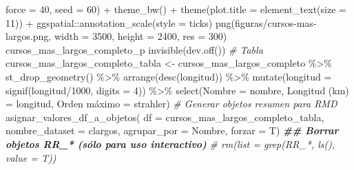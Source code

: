 \documentclass[spanish]{article}
\newenvironment{Shaded}{\begin{snugshade}}{\end{snugshade}}
\newcommand{\AttributeTok}[1]{\textcolor[rgb]{0.77,0.63,0.00}{#1}}
\newcommand{\CommentTok}[1]{\textcolor[rgb]{0.56,0.35,0.01}{\textit{#1}}}
\newcommand{\DecValTok}[1]{\textcolor[rgb]{0.00,0.00,0.81}{#1}}
\newcommand{\DocumentationTok}[1]{\textcolor[rgb]{0.56,0.35,0.01}{\textbf{\textit{#1}}}}
\newcommand{\FunctionTok}[1]{\textcolor[rgb]{0.00,0.00,0.00}{#1}}
\newcommand{\NormalTok}[1]{#1}
\newcommand{\OtherTok}[1]{\textcolor[rgb]{0.56,0.35,0.01}{#1}}
\newcommand{\SpecialCharTok}[1]{\textcolor[rgb]{0.00,0.00,0.00}{#1}}
\newcommand{\StringTok}[1]{\textcolor[rgb]{0.31,0.60,0.02}{#1}}
\begin{document}
\begin{Shaded}
\begin{Highlighting}[]
    \AttributeTok{force =} \DecValTok{40}\NormalTok{, }\AttributeTok{seed =} \DecValTok{60}\NormalTok{) }\SpecialCharTok{+}
  \FunctionTok{theme\_bw}\NormalTok{() }\SpecialCharTok{+} 
  \FunctionTok{theme}\NormalTok{(}\AttributeTok{plot.title =} \FunctionTok{element\_text}\NormalTok{(}\AttributeTok{size =} \DecValTok{11}\NormalTok{)) }\SpecialCharTok{+}
\NormalTok{  ggspatial}\SpecialCharTok{::}\FunctionTok{annotation\_scale}\NormalTok{(}\AttributeTok{style =} \StringTok{\textquotesingle{}ticks\textquotesingle{}}\NormalTok{)}
\FunctionTok{png}\NormalTok{(}\StringTok{\textquotesingle{}figuras/cursos{-}mas{-}largos.png\textquotesingle{}}\NormalTok{,}
    \AttributeTok{width =} \DecValTok{3500}\NormalTok{, }\AttributeTok{height =} \DecValTok{2400}\NormalTok{, }\AttributeTok{res =} \DecValTok{300}\NormalTok{)}
\NormalTok{cursos\_mas\_largos\_completo\_p}
\FunctionTok{invisible}\NormalTok{(}\FunctionTok{dev.off}\NormalTok{())}
\CommentTok{\# Tabla}
\NormalTok{cursos\_mas\_largos\_completo\_tabla }\OtherTok{\textless{}{-}}\NormalTok{ cursos\_mas\_largos\_completo }\SpecialCharTok{\%\textgreater{}\%} 
  \FunctionTok{st\_drop\_geometry}\NormalTok{() }\SpecialCharTok{\%\textgreater{}\%} 
  \FunctionTok{arrange}\NormalTok{(}\FunctionTok{desc}\NormalTok{(longitud)) }\SpecialCharTok{\%\textgreater{}\%} 
  \FunctionTok{mutate}\NormalTok{(}\AttributeTok{longitud =} \FunctionTok{signif}\NormalTok{(longitud}\SpecialCharTok{/}\DecValTok{1000}\NormalTok{, }\AttributeTok{digits =} \DecValTok{4}\NormalTok{)) }\SpecialCharTok{\%\textgreater{}\%}
  \FunctionTok{select}\NormalTok{(}\AttributeTok{Nombre =}\NormalTok{ nombre, }\StringTok{\textasciigrave{}}\AttributeTok{Longitud (km)}\StringTok{\textasciigrave{}} \OtherTok{=}\NormalTok{ longitud, }\StringTok{\textasciigrave{}}\AttributeTok{Orden máximo}\StringTok{\textasciigrave{}} \OtherTok{=}\NormalTok{ strahler)}
\CommentTok{\# Generar objetos  resumen para RMD}
\FunctionTok{asignar\_valores\_df\_a\_objetos}\NormalTok{(}
  \AttributeTok{df =}\NormalTok{ cursos\_mas\_largos\_completo\_tabla,}
  \AttributeTok{nombre\_dataset =} \StringTok{\textquotesingle{}clargos\textquotesingle{}}\NormalTok{,}
  \AttributeTok{agrupar\_por =} \StringTok{\textquotesingle{}Nombre\textquotesingle{}}\NormalTok{, }\AttributeTok{forzar =}\NormalTok{ T)}
\DocumentationTok{\#\# Borrar objetos RR\_* (sólo para uso interactivo)}
\CommentTok{\# rm(list = grep(\textquotesingle{}RR\_*\textquotesingle{}, ls(), value = T))}
\end{Highlighting}
\end{Shaded}
\end{document}
